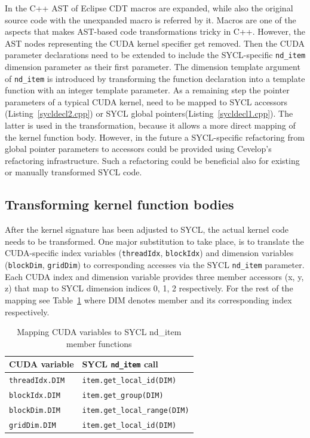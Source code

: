 \documentclass[sigconf]{acmart}
\newcommand{\inputsycl}[2]{}
\newcommand{\tcode}[1]{\texttt{#1}}
\begin{document}
In the C++ AST of Eclipse CDT macros are expanded, while also the original source code with the unexpanded macro is referred by it. 
Macros are one of the aspects that makes AST-based code transformations tricky in C++. 
However, the AST nodes representing the CUDA kernel specifier get removed. 
Then the CUDA parameter declarations need to be extended to include the SYCL-specific \tcode{nd_item} dimension parameter as their first parameter. The dimension template argument of \tcode{nd_item} is introduced by transforming the function declaration into a template function with an integer template parameter. 
As a remaining step the pointer parameters of a typical CUDA kernel, need to be mapped to SYCL accessors (Listing~\ref{sycldecl2.cpp}) or SYCL global pointers(Listing~\ref{sycldecl1.cpp}). 
The latter is used in the transformation, because it allows a more direct mapping of the kernel function body. 
However, in the future a SYCL-specific refactoring from global pointer parameters to accessors could be provided using Cevelop's refactoring infrastructure. Such a refactoring could be beneficial also for existing or manually transformed SYCL code.
\inputsycl{sycldecl1.cpp}{SYCL declaration with global pointers}
\inputsycl{sycldecl2.cpp}{SYCL declaration with accessors}

\subsection{Transforming kernel function bodies}
After the kernel signature has been adjusted to SYCL, the actual kernel code needs to be transformed. One major substitution to take place, is to translate the CUDA-specific index variables (\tcode{threadIdx}, \tcode{blockIdx}) and dimension variables (\tcode{blockDim}, \tcode{gridDim}) to corresponding accesses via the SYCL \tcode{nd_item} parameter. Each CUDA index and dimension variable provides three member accessors (x, y, z) that map to SYCL dimension indices 0, 1, 2 respectively. For the rest of the mapping see Table~\ref{tab:mapping} where DIM denotes member and its corresponding index respectively.
\begin{table}[htp]
\begin{center}\begin{tabular}{|l|l|}
\hline
 CUDA variable & SYCL \tcode{nd_item} call \\\hline
  \tcode{threadIdx.DIM} & \tcode{item.get_local_id(DIM)} \\\hline
   \tcode{blockIdx.DIM} & \tcode{item.get_group(DIM)} \\\hline
    \tcode{blockDim.DIM} & \tcode{item.get_local_range(DIM)} \\\hline
     \tcode{gridDim.DIM} & \tcode{item.get_local_id(DIM)} \\\hline
      \end{tabular} 
      \caption{Mapping CUDA variables to SYCL nd_item member functions}
\end{center}
\label{tab:mapping}
\end{table}
      
\end{document}
